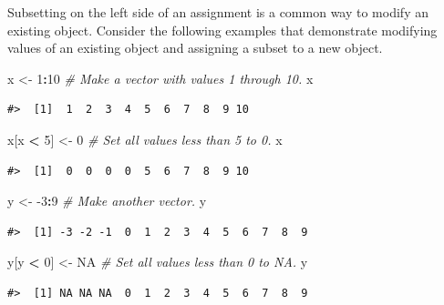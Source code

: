 \documentclass[
  11pt,
]{krantz}
\newenvironment{Shaded}{\begin{snugshade}}{\end{snugshade}}
\newcommand{\CommentTok}[1]{\textcolor[rgb]{0.56,0.35,0.01}{\textit{#1}}}
\newcommand{\DecValTok}[1]{\textcolor[rgb]{0.00,0.00,0.81}{#1}}
\newcommand{\NormalTok}[1]{#1}
\newcommand{\OperatorTok}[1]{\textcolor[rgb]{0.81,0.36,0.00}{\textbf{#1}}}
\newcommand{\OtherTok}[1]{\textcolor[rgb]{0.56,0.35,0.01}{#1}}
\newcommand{\StringTok}[1]{\textcolor[rgb]{0.31,0.60,0.02}{#1}}
\theoremstyle{definition}
\theoremstyle{definition}
\theoremstyle{definition}
\theoremstyle{definition}
\theoremstyle{remark}
\begin{document}
Subsetting on the left side of an assignment is a common way to modify an existing object. Consider the following examples that demonstrate modifying values of an existing object and assigning a subset to a new object.

\begin{Shaded}
\begin{Highlighting}[]
\NormalTok{x \textless{}{-}}\StringTok{ }\DecValTok{1}\OperatorTok{:}\DecValTok{10} \CommentTok{\# Make a vector with values 1 through 10.}
\NormalTok{x}
\end{Highlighting}
\end{Shaded}

\begin{verbatim}
#>  [1]  1  2  3  4  5  6  7  8  9 10
\end{verbatim}

\begin{Shaded}
\begin{Highlighting}[]
\NormalTok{x[x }\OperatorTok{\textless{}}\StringTok{ }\DecValTok{5}\NormalTok{] \textless{}{-}}\StringTok{ }\DecValTok{0} \CommentTok{\# Set all values less than 5 to 0.}
\NormalTok{x}
\end{Highlighting}
\end{Shaded}

\begin{verbatim}
#>  [1]  0  0  0  0  5  6  7  8  9 10
\end{verbatim}

\begin{Shaded}
\begin{Highlighting}[]
\NormalTok{y \textless{}{-}}\StringTok{ }\DecValTok{{-}3}\OperatorTok{:}\DecValTok{9} \CommentTok{\# Make another vector.}
\NormalTok{y}
\end{Highlighting}
\end{Shaded}

\begin{verbatim}
#>  [1] -3 -2 -1  0  1  2  3  4  5  6  7  8  9
\end{verbatim}

\begin{Shaded}
\begin{Highlighting}[]
\NormalTok{y[y }\OperatorTok{\textless{}}\StringTok{ }\DecValTok{0}\NormalTok{] \textless{}{-}}\StringTok{ }\OtherTok{NA} \CommentTok{\# Set all values less than 0 to NA.}
\NormalTok{y}
\end{Highlighting}
\end{Shaded}

\begin{verbatim}
#>  [1] NA NA NA  0  1  2  3  4  5  6  7  8  9
\end{verbatim}
\end{document}

